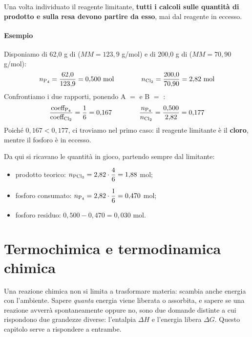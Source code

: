 \documentclass[11pt, a4paper, openright]{book}
\begin{document}
\medskip
\noindent
Una volta individuato il reagente limitante, \textbf{tutti i calcoli sulle quantità di prodotto e sulla resa devono partire da esso}, mai dal reagente in eccesso.

\subsubsection{Esempio}
\begin{center}
\end{center}
Disponiamo di 62,0 g di  ($MM = 123{,}9$ g/mol) e di 200,0 g di  ($MM = 70{,}90$ g/mol):
\[
n_{\ce{P4}} = \frac{62{,}0}{123{,}9} = 0{,}500\ \mathrm{mol}
\qquad\qquad
n_{\ce{Cl2}} = \frac{200{,}0}{70{,}90} = 2{,}82\ \mathrm{mol}
\]
Confrontiamo i due rapporti, ponendo A $=$  e B $=$ :
\[
\frac{\text{coeff}_{\ce{P4}}}{\text{coeff}_{\ce{Cl2}}} = \frac{1}{6} = 0{,}167
\qquad\qquad
\frac{n_{\ce{P4}}}{n_{\ce{Cl2}}} = \frac{0{,}500}{2{,}82} = 0{,}177
\]
Poiché $0{,}167 < 0{,}177$, ci troviamo nel primo caso: il reagente limitante è il \textbf{cloro}, mentre il fosforo è in eccesso.

\medskip
\noindent
Da qui si ricavano le quantità in gioco, partendo sempre dal limitante:
\begin{itemize}
    \item prodotto teorico: $n_{\ce{PCl3}} = 2{,}82 \cdot \dfrac{4}{6} = 1{,}88$ mol;
    \item fosforo consumato: $n_{\ce{P4}} = 2{,}82 \cdot \dfrac{1}{6} = 0{,}470$ mol;
    \item fosforo residuo: $0{,}500 - 0{,}470 = 0{,}030$ mol.
\end{itemize}


\chapter{Termochimica e termodinamica chimica}

Una reazione chimica non si limita a trasformare materia: scambia anche energia con
l'ambiente. Sapere \emph{quanta} energia viene liberata o assorbita, e sapere se una
reazione avverrà spontaneamente oppure no, sono due domande distinte a cui rispondono
due grandezze diverse: l'entalpia $\Delta H$ e l'energia libera $\Delta G$. Questo
capitolo serve a rispondere a entrambe.
\end{document}
